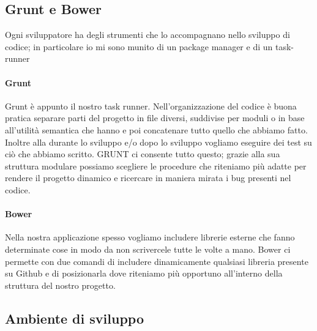 \subsection{Grunt e Bower}
Ogni sviluppatore ha degli strumenti che lo accompagnano nello sviluppo di codice; in particolare io mi sono munito di un package manager e di un task-runner
\paragraph*{Grunt}
Grunt è appunto il nostro task runner. Nell'organizzazione del codice è buona pratica separare parti del progetto in file diversi, suddivise per moduli o in base all'utilità semantica che hanno e poi concatenare tutto quello che abbiamo fatto. Inoltre alla durante lo sviluppo e/o dopo lo sviluppo vogliamo eseguire dei test su ciò che abbiamo scritto. GRUNT ci consente tutto questo; grazie alla sua struttura modulare possiamo scegliere le procedure che riteniamo più adatte per rendere il progetto dinamico e ricercare in maniera mirata i bug presenti nel codice.
\paragraph*{Bower}
Nella nostra applicazione spesso vogliamo includere librerie esterne che fanno determinate cose in modo da non scrivercele tutte le volte a mano. Bower ci permette con due comandi di includere dinamicamente qualsiasi libreria presente su Github e di posizionarla dove riteniamo più opportuno all'interno della struttura del nostro progetto.
\subsection{Ambiente di sviluppo}

